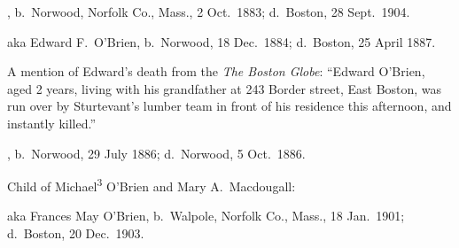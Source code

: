 \begin{Kids}
	
	, b.\ Norwood, Norfolk Co., Mass., 2 Oct.\ 1883;\cite{Arthur4OBrienBirth} d.\ Boston, 28 Sept.\ 1904.\cite{Arthur4OBrienDeath}
	
	 aka Edward F.\ O'Brien, b.\ Norwood, 18 Dec.\ 1884;\cite{Edward4OBrien2Birth} d.\ Boston, 25 April 1887.\cite{Edward4OBrien2Death}
	
	\begin{KidsMoreText}
		A mention of Edward's death from the \textit{The Boston Globe}: ``Edward O'Brien, aged 2 years, living with his grandfather at 243 Border street, East Boston, was run over by Sturtevant's lumber team in front of his residence this afternoon, and instantly killed.''\cite{Edward4OBrien2Death2}
	\end{KidsMoreText}
	
	, b.\ Norwood, 29 July 1886;\cite{Elizabeth4OBrienBirth} d.\ Norwood, 5 Oct.\ 1886.\cite{Elizabeth4OBrienDeath}
	
\end{Kids}

\begin{KidsIntro}
	Child of Michael\textsuperscript{3} O'Brien and Mary A.\ Macdougall:
\end{KidsIntro}

\begin{Kids}
	 aka Frances May O'Brien, b.\ Walpole, Norfolk Co., Mass., 18 Jan.\ 1901;\cite{Frances4OBrienBirth} d.\ Boston, 20 Dec.\ 1903.\cite{Frances4OBrienDeath}
\end{Kids}